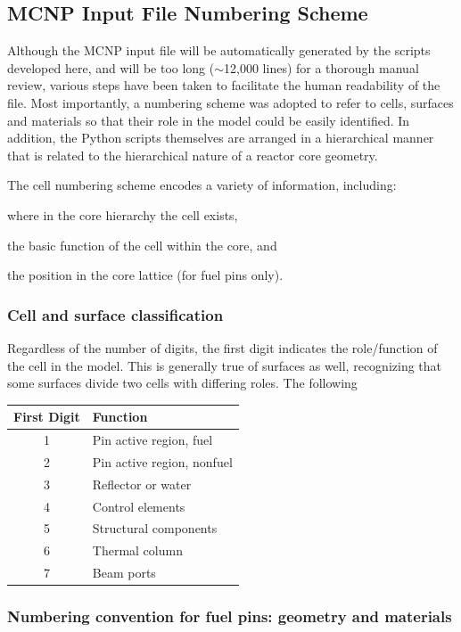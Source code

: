 \documentclass{UWNR_modeling}
\begin{document}
\subsection{MCNP Input File Numbering Scheme}

Although the MCNP input file will be automatically generated by the scripts developed here, and will be too long ($\sim$12,000 lines) for a thorough manual review, various steps have been taken to facilitate the human readability of the file.   Most importantly, a numbering scheme was adopted to refer to cells, surfaces and materials so that their role in the model could be easily identified.  In addition, the Python scripts themselves are arranged in a hierarchical manner that is related to the hierarchical nature of a reactor core geometry.

The cell numbering scheme encodes a variety of information, including:\vspace{-0.9\parsep}
\begin{myitemize}
\item where in the core hierarchy the cell exists,
\item the basic function of the cell within the core, and
\item the position in the core lattice (for fuel pins only).
\end{myitemize}
\subsubsection{Cell and surface classification}

Regardless of the number of digits, the first digit indicates the role/function of the cell in the model.  This is generally true of surfaces as well, recognizing that some surfaces divide two cells with differing roles.  The following

\begin{tabular}{|c|l|}
\hline First Digit & Function\\\hline
1 & Pin active region, fuel\\
2 & Pin active region, nonfuel\\
3 & Reflector or water\\
4 & Control elements\\
5 & Structural components\\
6 & Thermal column\\
7 & Beam ports\\\hline
\end{tabular}

\subsubsection{Numbering convention for fuel pins: geometry and materials}
\end{document}

